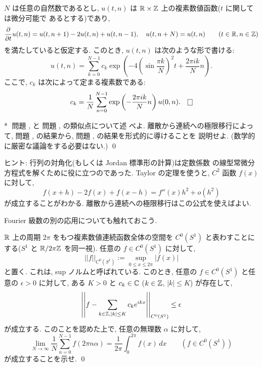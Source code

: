 \documentclass[12pt,twoside]{jarticle}
\def\qstar#1{$\!\!\!$#1$\;$}
\def\Z{{\Bbb Z}} %
\def\R{{\Bbb R}} %
\def\C{{\Bbb C}} %
\def\pd#1#2{\frac{\partial #1}{\partial #2}}
\begin{document}
\begin{question}[空間方向を離散化した熱方程式]\label{q:disc-heat2}
  $N$ は任意の自然数であるとし, %
  $u(t,n)$ は $\R \times \Z$ 上の複素数値函数($t$ に関しては微分可能で
  あるとする)であり,
  \[%
    \pd{}{t} u(t,n) = u(t,n+1) - 2 u(t,n) + u(t,n-1),
    \quad
    u(t,n+N) = u(t,n)
    \qquad
    (t \in \R, n \in \Z)
  \]%
  を満たしていると仮定する. このとき, $u(t,n)$ は次のような形で書ける:
  \[
    u(t,n)
    = 
    \sum_{k=0}^{N-1}
    c_k
    \exp\left(
      - 4\left( \sin\frac{\pi k}{N} \right)^2 t + \frac{2\pi ik}{N} n
    \right).
  \]
  ここで, $c_k$ は次によって定まる複素数である:
  \[
    c_k
    =
    \frac{1}{N}
    \sum_{n=0}^{N-1}
    \exp\left( - \frac{2\pi ik}{N} n \right) u(0,n).
  \qed
  \]
\end{question}

\begin{question}\qstar{*}
  問題 ,  と%
  問題 ,  の類似点について述
  べよ. 離散から連続への極限移行によって, %
  問題 ,  の結果から, %
  問題 ,  の結果を形式的に導けることを
  説明せよ. (数学的に厳密な議論をする必要はない.) 
  \qed
\end{question}

\noindent ヒント: 行列の対角化(もしくは Jordan 標準形の計算)は定数係数
の線型常微分方程式を解くために役に立つのであった.  %
Taylor の定理を使うと, $C^2$ 函数 $f(x)$ に対して, %
\[
  f(x+h) - 2 f(x) + f(x-h) = f''(x) h^2 + o(h^2)
\]%
が成立することがわかる. 離散から連続への極限移行はこの公式を使えばよい.

Fourier 級数の別の応用についても触れておこう.

\begin{question}[Weylの原理]\label{q:ergodicity1}
  $\R$ 上の周期 $2\pi$ をもつ複素数値連続函数全体の空間を $C^0(S^1)$ %
  と表わすことにする($S^1$ と $\R/2\pi\Z$ を同一視). %
  任意の $f\in C^0(S^1)$ に対して, 
  \[
    ||f||_{C^0(S^1)} := \sup_{0 \le x \le 2\pi} |f(x)|
  \]%
  と置く. これは, sup ノルムと呼ばれている. %
  このとき, 任意の $f\in C^0(S^1)$ と任意の $\epsilon > 0$ に対して, 
  ある $K > 0$ と $c_k \in \C$ ($k\in\Z$, $|k| \le K$) が存在して,
  \[
    \left|\left|
      f - \sum_{k\in\Z, |k|\le K} c_k e^{ikx}
    \right|\right|_{C^0(S^1)}
    \le 
    \epsilon
  \]%
  が成立する. このことを認めた上で, 任意の無理数 $\alpha$ に対して,
  \[
    \lim_{N \to \infty} \frac{1}{N} \sum_{n=0}^{N-1} f(2\pi n \alpha)
    =
    \frac{1}{2\pi} \int_0^{2\pi} f(x) \,dx
    \qquad
    (f \in C^0(S^1))
  \]
  が成立することを示せ. \qed
\end{question}
\end{document}
